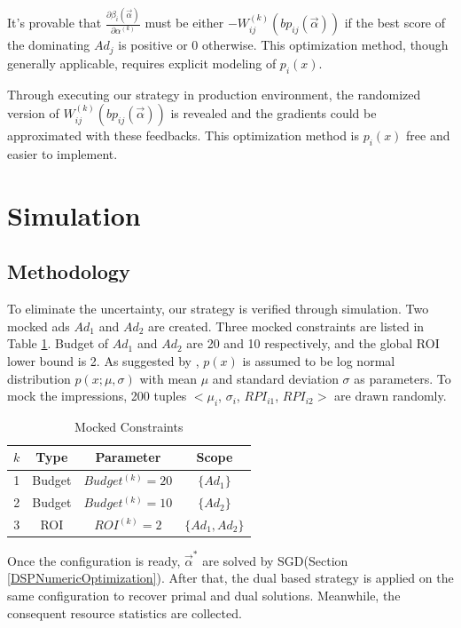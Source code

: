 \documentclass{article}
\newcommand{\sbp}{bp_{ij}}
\newcommand{\sW}{W_{ij}^{(k)}}
\newcommand{\salpha}{\alpha^{(k)}}
\newcommand{\sbeta}{\beta_i}
\newcommand{\valpha}{\vec{\alpha}}
\begin{document}
It's provable that $\frac{\partial\sbeta(\valpha)}{\partial\salpha}$ must be
    either $-\sW(\sbp(\valpha))$ if the best score of the dominating $Ad_j$ is positive or $0$ otherwise.
This optimization method, though generally applicable, requires explicit modeling of $p_i(x)$.

Through executing our strategy in production environment, the randomized version of $\sW(\sbp(\valpha))$ is revealed
    and the gradients could be approximated with these feedbacks.
This optimization method is $p_i(x)$ free and easier to implement.

\section{Simulation} \label{Simulation}

\subsection{Methodology}

To eliminate the uncertainty, our strategy is verified through simulation.
Two mocked ads $Ad_1$ and $Ad_2$ are created.
Three mocked constraints are listed in Table \ref{TableConstraints}.
Budget of $Ad_1$ and $Ad_2$ are 20 and 10 respectively, and the global ROI lower bound is 2.
As suggested by \cite{YingCui2011}, $p(x)$ is assumed to be log normal distribution $p(x;\mu,\sigma)$
    with mean $\mu$ and standard deviation $\sigma$ as parameters.
To mock the impressions, 200 tuples $<\mu_i$, $\sigma_i$, $RPI_{i1}$, $RPI_{i2}>$ are drawn randomly.

\begin{table}
\caption{Mocked Constraints\label{TableConstraints}}
\begin{center}
\begin{tabular}{|c|c|c|c|}
\hline
$k$ & Type            & Parameter           & Scope   \\
\hline
1   & Budget          & $Budget^{(k)} = 20$ & $\{Ad_1\}$        \\
\hline
2   & Budget          & $Budget^{(k)} = 10$ & $\{Ad_2\}$        \\
\hline
3   & ROI             & $ROI^{(k)} = 2$     & $\{Ad_1, Ad_2\}$  \\
\hline
\end{tabular}
\end{center}
\end{table}

Once the configuration is ready, $\valpha^*$ are solved by SGD(Section \ref{DSPNumericOptimization}).
After that, the dual based strategy is applied on the same configuration to recover primal and dual solutions.
Meanwhile, the consequent resource statistics are collected.
\end{document}
